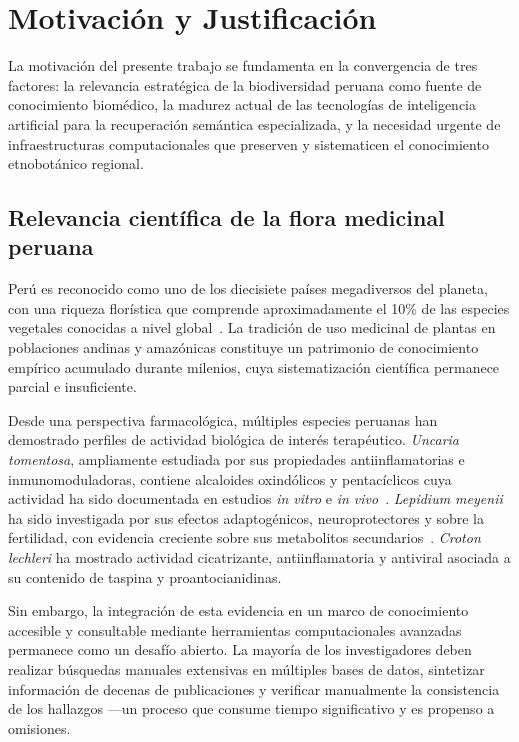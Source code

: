 
\section{Motivación y Justificación}
\label{sec:motivation}

La motivación del presente trabajo se fundamenta en la convergencia de tres factores: la relevancia estratégica de la biodiversidad peruana como fuente de conocimiento biomédico, la madurez actual de las tecnologías de inteligencia artificial para la recuperación semántica especializada, y la necesidad urgente de infraestructuras computacionales que preserven y sistematicen el conocimiento etnobotánico regional.

\subsection{Relevancia científica de la flora medicinal peruana}
\label{subsec:relevance_flora}

Perú es reconocido como uno de los diecisiete países megadiversos del planeta, con una riqueza florística que comprende aproximadamente el 10\% de las especies vegetales conocidas a nivel global~\cite{bussmann2015toxicity}. La tradición de uso medicinal de plantas en poblaciones andinas y amazónicas constituye un patrimonio de conocimiento empírico acumulado durante milenios, cuya sistematización científica permanece parcial e insuficiente.

Desde una perspectiva farmacológica, múltiples especies peruanas han demostrado perfiles de actividad biológica de interés terapéutico. \textit{Uncaria tomentosa}, ampliamente estudiada por sus propiedades antiinflamatorias e inmunomoduladoras, contiene alcaloides oxindólicos y pentacíclicos cuya actividad ha sido documentada en estudios \textit{in vitro} e \textit{in vivo}~\cite{lock2016uncaria}. \textit{Lepidium meyenii} ha sido investigada por sus efectos adaptogénicos, neuroprotectores y sobre la fertilidad, con evidencia creciente sobre sus metabolitos secundarios~\cite{gonzales2012ethnobiology}. \textit{Croton lechleri} ha mostrado actividad cicatrizante, antiinflamatoria y antiviral asociada a su contenido de taspina y proantocianidinas.

Sin embargo, la integración de esta evidencia en un marco de conocimiento accesible y consultable mediante herramientas computacionales avanzadas permanece como un desafío abierto. La mayoría de los investigadores deben realizar búsquedas manuales extensivas en múltiples bases de datos, sintetizar información de decenas de publicaciones y verificar manualmente la consistencia de los hallazgos —un proceso que consume tiempo significativo y es propenso a omisiones.

